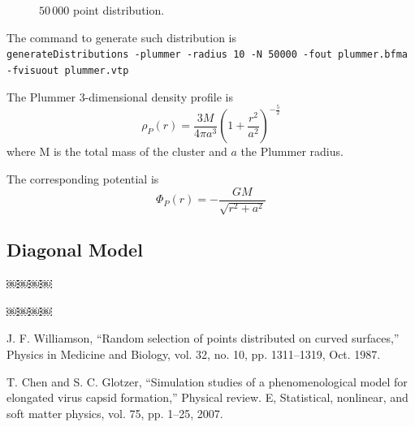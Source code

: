 \documentclass[10pt]{article}
\begin{document}
\begin{figure}[h]
\begin{minipage}{0.45\textwidth}
    \caption{$50\,000$ point distribution.}%
      \end{minipage}%

\end{figure}

The command to generate such distribution is\\
\texttt{generateDistributions -plummer -radius 10 -N 50000 -fout plummer.bfma  -fvisuout plummer.vtp 
} 



The Plummer 3-dimensional density profile is 
\begin{equation}
\rho_P(r) = \frac{3 M}{4\pi a^3} (1+\frac{r^2}{a^2})^{-\frac{5}{2}}
\end{equation}
where M is the total mass of the cluster and $a$ the Plummer radius. 

The corresponding potential is 
\begin{equation}
\Phi_P(r) = - \frac{G M}{\sqrt{r^2+a^2}}
\end{equation}
\subsection{Diagonal Model}


  ￼￼￼￼


  ￼￼￼￼
\newpage
\begin{thebibliography}{1}
 J. F. Williamson, “Random selection of points distributed on curved surfaces,” Physics in Medicine and Biology, vol. 32, no. 10, pp. 1311–1319, Oct. 1987.

 T. Chen and S. C. Glotzer, “Simulation studies of a phenomenological model for elongated virus capsid formation,” Physical review. E, Statistical, nonlinear, and soft matter physics, vol. 75, pp. 1–25, 2007.

\end{thebibliography}
\end{document}
